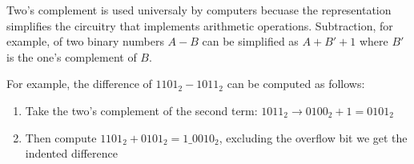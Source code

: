 Two's complement is used universaly by computers becuase the representation simplifies the 
circuitry that implements arithmetic operations. Subtraction, for example, of two binary numbers $A-B$ can be
simplified as $A+B'+1$ where $B'$ is the one's complement of $B$.

For example, the difference of $1101_2 - 1011_2$ can be computed as follows:

\begin{enumerate}
    \item Take the two's complement of the second term: $1011_2\rightarrow0100_2 + 1 = 0101_2$
    \item Then compute $1101_2 + 0101_2 = 1\_0010_2$, excluding the overflow bit we get the indented
    difference
\end{enumerate}